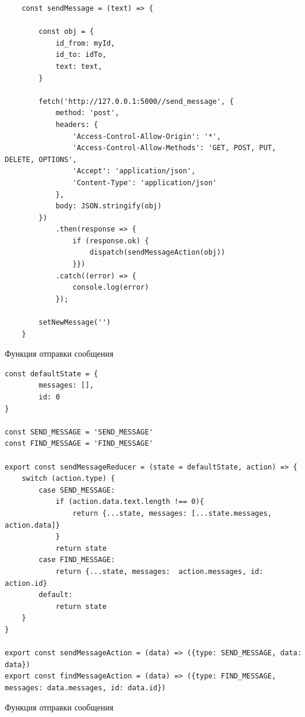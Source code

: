 \documentclass[14pt,final]{report}
\begin{document}
\begin{listing}[!h]
\begin{verbatim}
    const sendMessage = (text) => {

        const obj = {
            id_from: myId,
            id_to: idTo,
            text: text,
        }

        fetch('http://127.0.0.1:5000//send_message', {
            method: 'post',
            headers: {
                'Access-Control-Allow-Origin': '*',
                'Access-Control-Allow-Methods': 'GET, POST, PUT, DELETE, OPTIONS',
                'Accept': 'application/json',
                'Content-Type': 'application/json'
            },
            body: JSON.stringify(obj)
        })
            .then(response => {
                if (response.ok) {
                    dispatch(sendMessageAction(obj))
                }})
            .catch((error) => {
                console.log(error)
            });

        setNewMessage('')
    }
\end{verbatim}
\caption{Функция отправки сообщения}
\label{send}
\end{listing}

\begin{listing}[!h]
\begin{verbatim}
const defaultState = {
        messages: [],
        id: 0
}

const SEND_MESSAGE = 'SEND_MESSAGE'
const FIND_MESSAGE = 'FIND_MESSAGE'

export const sendMessageReducer = (state = defaultState, action) => {
    switch (action.type) {
        case SEND_MESSAGE:
            if (action.data.text.length !== 0){
                return {...state, messages: [...state.messages, action.data]}
            }
            return state
        case FIND_MESSAGE:
            return {...state, messages:  action.messages, id: action.id}
        default:
            return state
    }
}

export const sendMessageAction = (data) => ({type: SEND_MESSAGE, data: data})
export const findMessageAction = (data) => ({type: FIND_MESSAGE, messages: data.messages, id: data.id})
\end{verbatim}
\caption{Функция отправки сообщения}
\label{sendReducer}
\end{listing}
\end{document}
